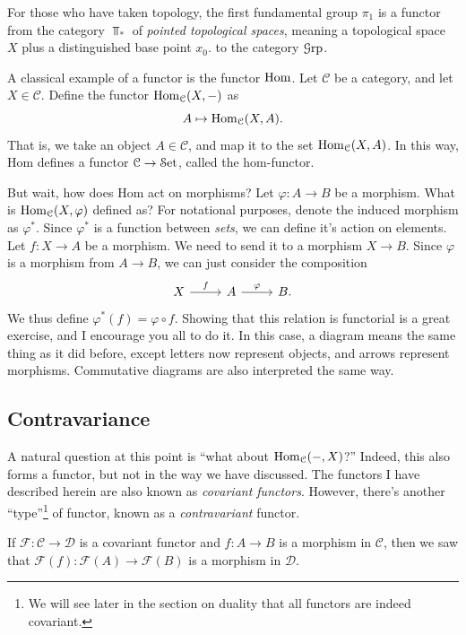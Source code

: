 For those who have taken topology, the first fundamental group $\pi _1$ is a functor from the category $\Top_*$ of \emph{pointed topological spaces}, meaning a topological space $X$ plus a distinguished base point $x_0$. to the category $\mathcal{G}\mathrm{rp} $.

A classical example of a functor is the functor $\operatorname{Hom}$. Let $\mathcal{C} $ be a category, and let $X\in \mathcal{C} $. Define the functor $\operatorname{Hom}_{\mathcal{C} }(X, -) $ as
\[
	A\mapsto \operatorname{Hom}_{\mathcal{C} }(X, A) 
.\]
That is, we take an object $A\in \mathcal{C} $, and map it to the set $\operatorname{Hom}_{\mathcal{C} }(X, A) $. In this way, Hom defines a functor $\mathcal{C} \to \mathcal{S}\mathrm{et} $, called the hom-functor.

But wait, how does Hom act on morphisms? Let $\varphi : A \to B$ be a morphism. What is $\operatorname{Hom}_{\mathcal{C} }(X, \varphi) $ defined as? For notational purposes, denote the induced morphism as $\varphi ^*$. Since $\varphi ^*$ is a function between \emph{sets}, we can define it's action on elements. Let $f : X \to A$ be a morphism. We need to send it to a morphism $X\to B$. Since $\varphi $ is a morphism from $A\to B$, we can just consider the composition
\[\begin{tikzcd}[row sep = 2.5em, column sep = 2.5em]
X\ar[" f ", r]  & A\ar[" \varphi  ", r]  & B.
\end{tikzcd}\]
We thus define $\varphi ^*(f)=\varphi \circ f$. Showing that this relation is functorial is a great exercise, and I encourage you all to do it. In this case, a diagram means the same thing as it did before, except letters now represent objects, and arrows represent morphisms. Commutative diagrams are also interpreted the same way.

\subsection{Contravariance}

A natural question at this point is ``what about $\operatorname{Hom}_{\mathcal{C} }(-, X) $?'' Indeed, this also forms a functor, but not in the way we have discussed. The functors I have described herein are also known as \emph{covariant functors}. However, there's another ``type''\footnote{We will see later in the section on duality that all functors are indeed covariant.} of functor, known as a \emph{contravariant} functor.

If $\mathcal{F} : \mathcal{C}  \to \mathcal{D} $ is a covariant functor and $f : A \to B$ is a morphism in $\mathcal{C} $, then we saw that $\mathcal{F} (f): \mathcal{F} (A) \to \mathcal{F} (B)$ is a morphism in $\mathcal{D} $.

